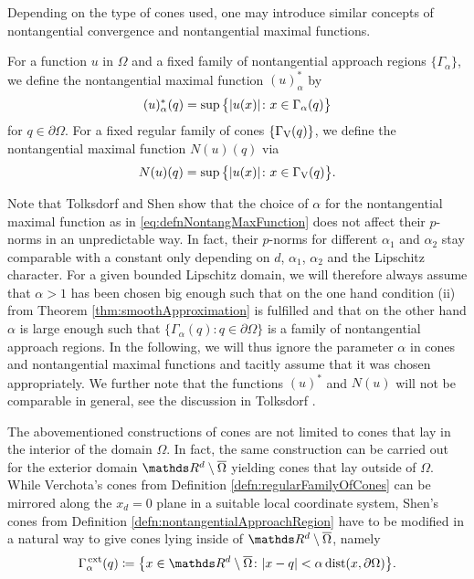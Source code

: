 Depending on the type of cones used, one may introduce similar concepts of nontangential convergence and nontangential maximal functions.

\begin{defn}
  For a function $u$ in $\Omega$ and a fixed family of nontangential approach regions $\{\Gamma_\alpha\}$, we define the nontangential maximal function $(u)_\alpha^*$ by
\begin{align}
  \label{eq:defnNontangMaxFunction}
  (u)_\alpha^*(q) = \sup\big\{ |u(x)| \colon x \in \Gamma_\alpha(q)\big\}
\end{align}
for $q \in \partial\Omega$.
  For a fixed regular family of cones $\{\Gamma_\mathrm{V}(q)\}$, we define the nontangential maximal function $N(u)(q)$ via
  \begin{align*}
    N(u)(q) = \sup\big\{ |u(x)| \colon x \in \Gamma_\mathrm{V}(q)\big\}.
  \end{align*}
\end{defn}

Note that Tolksdorf \cite[Prop.\@~4.1.11]{tolksdorf} and Shen \cite[Prop.\@~7.1.2]{Shen2017} show that the choice of $\alpha$ for the nontangential maximal function as in \eqref{eq:defnNontangMaxFunction} does not affect their $p$-norms in an unpredictable way. In fact, their $p$-norms for different $\alpha_1$ and $\alpha_2$ stay comparable with a constant only depending on $d$, $\alpha_1$, $\alpha_2$ and the Lipschitz character.
For a given bounded Lipschitz domain, we will therefore always assume that $\alpha > 1$ has been chosen big enough such that on the one hand condition (ii) from Theorem \ref{thm:smoothApproximation} is fulfilled and that on the other hand $\alpha$ is large enough such that $\big\{ \Gamma_\alpha(q) \colon q \in \partial\Omega \big\}$ is a family of nontangential approach regions.
In the following, we will thus ignore the parameter $\alpha$ in cones and nontangential maximal functions and tacitly assume that it was chosen appropriately.
We further note that the functions $(u)^*$ and $N(u)$ will not be comparable in general, see the discussion in Tolksdorf \cite[p.\@~91]{tolksdorf}.

The abovementioned constructions of cones are not limited to cones that lay in the interior of the domain $\Omega$.
In fact, the same construction can be carried out for the exterior domain $\R^d \setminus \overline{\Omega}$ yielding cones that lay outside of $\Omega$. While Verchota's cones from Definition \ref{defn:regularFamilyOfCones} can be mirrored along the $x_d = 0$ plane in a suitable local coordinate system, Shen's cones from Definition \ref{defn:nontangentialApproachRegion} have to be modified in a natural way to give cones lying inside of $\R^d \setminus \overline \Omega$, namely
\begin{align*}
  \Gamma_\alpha^{\,\mathrm{ext}}(q) \coloneqq \big\{ x \in \R^d \setminus \overline \Omega \colon |x - q| < \alpha \operatorname{dist}(x, \partial\Omega)\big\}.
\end{align*}

